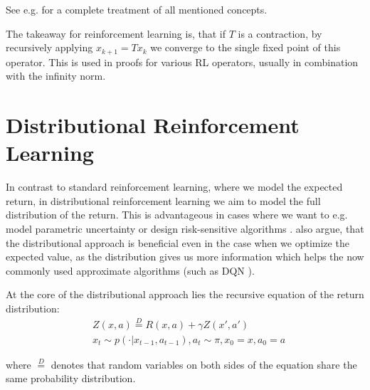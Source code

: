 See e.g. \citet{kreyszig1989introductory} for a complete treatment of all mentioned concepts.

The takeaway for reinforcement learning is, that if $T$ is a contraction, by recursively applying $x_{k+1}=Tx_k$ we converge to the single fixed point of this operator. This is used in proofs for various RL operators, usually in combination with the infinity norm.






\section{Distributional Reinforcement Learning}\label{sec:prelim:distrl}

In contrast to standard reinforcement learning, where we model the expected return, in distributional reinforcement learning \cite{many} we aim to model the full distribution of the return. This is advantageous in cases where we want to e.g. model parametric uncertainty \cite{...} or design risk-sensitive algorithms \citep{morimura2012parametric}\citep{morimura2010nonparametric}. \citet{bellemare2017distributional} also argue, that the distributional approach is beneficial even in the case when we optimize the expected value, as the distribution gives us more information which helps the now commonly used approximate algorithms (such as DQN \citep{mnih2015human}).

At the core of the distributional approach lies the recursive equation of the return distribution:
\begin{equation}
\begin{split}
&Z(x, a) \overset{D}{=} R(x, a) + \gamma Z(x', a')\\
&x_t \sim p(\cdot|x_{t-1}, a_{t-1}), a_t \sim \pi, x_0 = x, a_0 = a
\end{split}
\end{equation}

where $\overset{D}{=}$ denotes that random variables on both sides of the equation share the same probability distribution.

